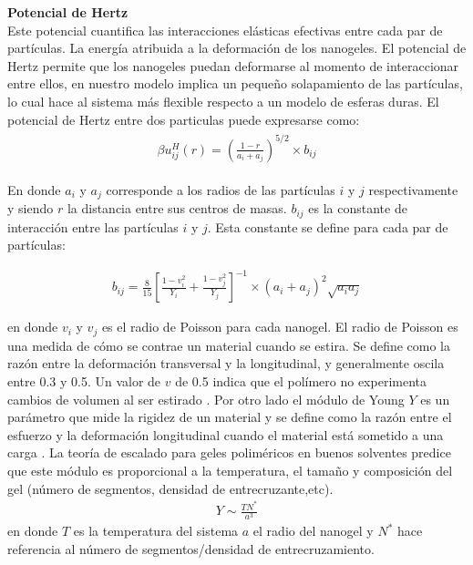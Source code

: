 	\textbf{Potencial de Hertz} \\
	
	Este  potencial  cuantifica las interacciones el\'asticas efectivas entre cada par de part\'iculas. La energ\'ia atribuida a la deformaci\'on de los nanogeles.  El potencial de Hertz permite que los nanogeles puedan deformarse al momento de interaccionar entre ellos, en nuestro modelo implica un peque\~no solapamiento de las part\'iculas, lo cual hace al sistema m\'as flexible respecto a un modelo de esferas duras. 
	El potencial de Hertz entre dos particulas puede expresarse como:
	\begin{align}
		\begin{aligned}
			\beta u^H_{ij} (r) = \left(\frac{1-r}{a_i + a_j}\right)^{5/2}\times b_{ij}
		\end{aligned}
		\label{eq:mc:hertz_ij}
	\end{align}
	
	\noindent En donde $a_i$ y $a_j$ corresponde a los radios de las part\'iculas $i$ y $j$ respectivamente y siendo $r$ la distancia entre sus centros de masas. $b_{ij}$ es la constante de interacci\'on entre las part\'iculas $i$ y $j$. Esta constante se define para cada par de part\'iculas:
	
	\begin{align}
		b_{ij} = \frac{8}{15}\left[\frac{1-v_i^2}{Y_i} + \frac{1-v_j^2}{Y_j}  \right]^{-1} \times(a_i +a_j)^2 \sqrt{a_ia_j}
		\label{eq:mc:bij_param}
	\end{align}
	
	\noindent en donde $v_i$ y $v_j$ es el radio de Poisson para cada nanogel.
	El radio de Poisson es una medida de c\'omo se contrae un material cuando se estira. Se define como la raz\'on entre la deformaci\'on transversal y la longitudinal, y generalmente oscila entre 0.3 y 0.5. Un valor de $v$ de 0.5 indica que el pol\'imero no experimenta cambios de volumen al ser estirado \cite{bertoldi2010negative}.
	Por otro lado el m\'odulo de  Young $Y$  es un par\'ametro  que mide la rigidez de un material y se define como la raz\'on entre el esfuerzo y la deformaci\'on longitudinal cuando el material est\'a sometido a una carga \cite{ku2011review}.
	La teor\'ia de escalado para geles polim\'ericos en buenos solventes \cite{de1979scaling,hu2012polymer} predice que este m\'odulo es proporcional a la temperatura, el tama\~no y composici\'on del gel (n\'umero de segmentos, densidad de entrecruzante,etc).
	\begin{align}
		Y \sim \frac{TN^*}{a^3}
	\end{align}
	\noindent en donde $T$ es la temperatura del sistema $a$ el radio del nanogel y $N^*$ hace referencia al n\'umero de segmentos/densidad de entrecruzamiento. \\
	
